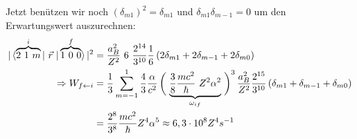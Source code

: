 	Jetzt benützen wir noch $(\delta_{m1})^2 = \delta_{m1}$ und $\delta_{m1}\delta_{m-1} = 0$ um den Erwartungswert auszurechnen:
		\begin{align*}
			|\braket{
				\overbrace{2~1~m }^{\mathclap{i}}| ~\vec{r}~ | \overbrace{1~0~0}^{\mathclap{f}}}|^2
				&= \frac{a_B^2}{Z^2} ~6~ \frac{2^{14}}{3^{10}} \frac{1}{6}
				\left(2 \delta_{m1} + 2 \delta_{m-1} + 2 \delta_{m0}\right) \\
				\Rightarrow W_{f \leftarrow i} &= 
				\frac{1}{3} \sum_{m=-1}^{1} \frac{4}{3} \frac{\alpha}{c^2}
				\left(\vphantom{\frac{3}{8}} \right.
					\underbrace{\frac{3}{8} \frac{m c^2}{\hbar} ~Z^2 \alpha^2}_{\mathclap{\omega_{if}}}
				\left. \vphantom{\frac{3}{8}} \right)^3 
				\frac{a_B^2}{Z^2} \frac{2^{15}}{3^{10}} 
				\left(\delta_{m1} + \delta_{m-1} + \delta_{m0}\right) \\
				&= \frac{2^8}{3^8} \frac{m c^2}{\hbar} Z^4 \alpha^5 
				\approx 6,3 \cdot 10^8 Z^4 s^{-1}
		\end{align*}
		